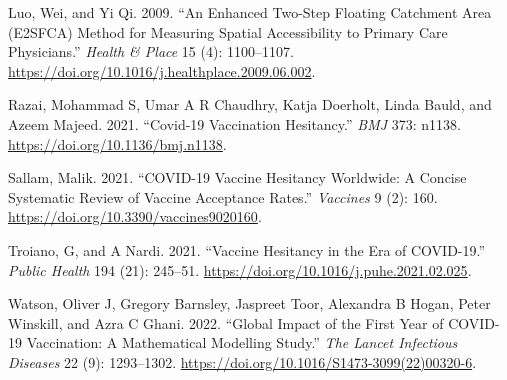 \documentclass{article}
\newlength{\cslhangindent}
\newenvironment{CSLReferences}[2] %
 {\begin{list}{}{%
  \setlength{\itemindent}{0pt}
  \setlength{\leftmargin}{0pt}
  \setlength{\parsep}{0pt}
  \ifodd #1
   \setlength{\leftmargin}{\cslhangindent}
   \setlength{\itemindent}{-1\cslhangindent}
  \fi
  \setlength{\itemsep}{#2\baselineskip}}}
 {\end{list}}
\begin{document}
\begin{CSLReferences}{1}{0}
Luo, Wei, and Yi Qi. 2009. {``An Enhanced Two-Step Floating Catchment
Area ({E2SFCA}) Method for Measuring Spatial Accessibility to Primary
Care Physicians.''} \emph{Health \& Place} 15 (4): 1100--1107.
\url{https://doi.org/10.1016/j.healthplace.2009.06.002}.

Razai, Mohammad S, Umar A R Chaudhry, Katja Doerholt, Linda Bauld, and
Azeem Majeed. 2021. {``Covid-19 Vaccination Hesitancy.''} \emph{BMJ}
373: n1138. \url{https://doi.org/10.1136/bmj.n1138}.

Sallam, Malik. 2021. {``COVID-19 Vaccine Hesitancy Worldwide: A Concise
Systematic Review of Vaccine Acceptance Rates.''} \emph{Vaccines} 9 (2):
160. \url{https://doi.org/10.3390/vaccines9020160}.

Troiano, G, and A Nardi. 2021. {``Vaccine Hesitancy in the Era of
COVID-19.''} \emph{Public Health} 194 (21): 245--51.
\url{https://doi.org/10.1016/j.puhe.2021.02.025}.

Watson, Oliver J, Gregory Barnsley, Jaspreet Toor, Alexandra B Hogan,
Peter Winskill, and Azra C Ghani. 2022. {``Global Impact of the First
Year of COVID-19 Vaccination: A Mathematical Modelling Study.''}
\emph{The Lancet Infectious Diseases} 22 (9): 1293--1302.
\url{https://doi.org/10.1016/S1473-3099(22)00320-6}.

\end{CSLReferences}



\end{document}
